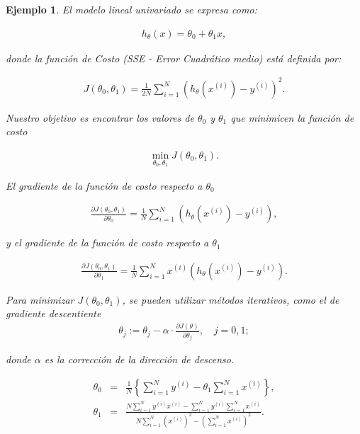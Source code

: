 \documentclass[12pt]{article}
\newtheorem{Ejem}{Ejemplo}%
\begin{document}
\begin{Ejem}
El modelo lineal univariado se expresa como:

\begin{eqnarray*}
h_\theta(x) = \theta_0 + \theta_1 x,
\end{eqnarray*}

donde la función de \textit{Costo (SSE - Error Cuadrático medio)} está definida por:

\begin{eqnarray*}
J(\theta_0, \theta_1) = \frac{1}{2N} \sum_{i=1}^{N} \left( h_\theta(x^{(i)}) - y^{(i)} \right)^2.
\end{eqnarray*}

Nuestro objetivo es encontrar los valores de $\theta_0$ y $\theta_1$ que minimicen la función de costo

\begin{eqnarray*}
\min_{\theta_0, \theta_1} J(\theta_0, \theta_1).
\end{eqnarray*}

El gradiente de la función de costo respecto a $\theta_0$

\begin{eqnarray*}
\frac{\partial J(\theta_0, \theta_1)}{\partial \theta_0} = \frac{1}{N} \sum_{i=1}^{N} \left( h_\theta(x^{(i)}) - y^{(i)} \right),
\end{eqnarray*}

y el gradiente de la función de costo respecto a $\theta_1$

\begin{eqnarray*}
\frac{\partial J(\theta_0, \theta_1)}{\partial \theta_1} = \frac{1}{N} \sum_{i=1}^{N} x^{(i)} \left( h_\theta(x^{(i)}) - y^{(i)} \right).
\end{eqnarray*}

Para minimizar $J(\theta_0, \theta_1)$, se pueden utilizar métodos iterativos, como el de gradiente descentiente
\begin{eqnarray*}
\theta_j := \theta_j - \alpha \cdot \frac{\partial J(\theta)}{\partial \theta_j}, \quad j = 0, 1;
\end{eqnarray*}

donde $\alpha$ es la corrección de la direcci\'on de descenso.


\begin{eqnarray*}
\theta_{0}&=& \frac{1}{N} \left\{\sum_{i=1}^{N} y^{(i)}-\theta_{1} \sum_{i=1}^{N}  x^{(i)}\right\},\\
\theta_{1}&=& \frac{N\sum_{i=1}^{N} y^{(i)}x^{(i)} -\sum_{i=1}^{N} y^{(i)}\sum_{i=1}^{N} x^{(i)}}{N\sum_{i=1}^{N} (x^{(i)})^{2}-(\sum_{i=1}^{N} x^{(i)})^{2}}.
\end{eqnarray*}


\end{Ejem}
\end{document}
